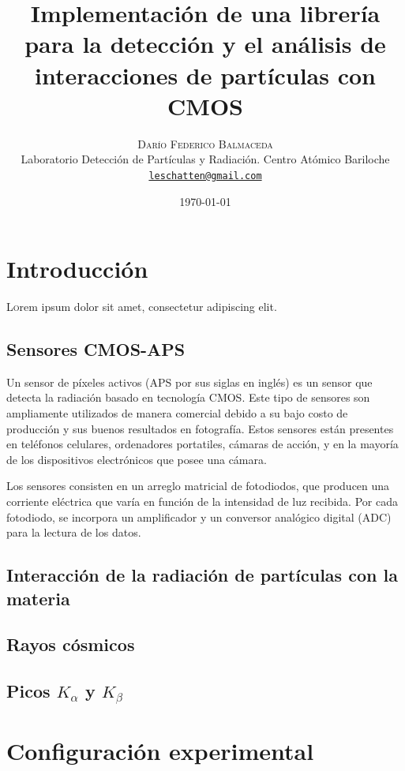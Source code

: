 \documentclass[twoside,twocolumn]{article}
\title{Implementación de una librería para la detección y el análisis de interacciones de partículas con CMOS}
\author{%
    \textsc{Darío Federico Balmaceda} \\[1ex]     %
    \normalsize Laboratorio Detección de Partículas y Radiación. Centro Atómico Bariloche \\                                    %
    \normalsize \href{mailto:leschatten@gmail.com}{\texttt{leschatten@gmail.com}}                   %
  }
\date{\today}                                                                %
\begin{document}
  
  \maketitle              %
  
  \section{Introducción}
    \lettrine[nindent=0em,lines=3]{L} orem ipsum dolor sit amet, consectetur adipiscing elit.
  
    \subsection{Sensores CMOS-APS}
      Un sensor de píxeles activos (APS por sus siglas en inglés) es un sensor que detecta la radiación basado en tecnología CMOS.
      Este tipo de sensores son ampliamente utilizados de manera comercial debido a su
      bajo costo de producción y sus buenos resultados en fotografía.
      Estos sensores están presentes en teléfonos celulares, ordenadores portatiles, cámaras de acción,
      y en la mayoría de los dispositivos electrónicos que posee una cámara.

      Los sensores consisten en un arreglo matricial de fotodiodos, 
      que producen una corriente eléctrica que varía en función de la intensidad de luz recibida.
      Por cada fotodiodo, se incorpora un amplificador y un conversor analógico digital (ADC) para la lectura de los datos.
  

    \subsection{Interacción de la radiación de partículas con la materia}

    \subsection{Rayos cósmicos}
    
    \subsection{Picos $K_{\alpha}$ y $K_{\beta}$}

  \section{Configuración experimental}
\end{document}
